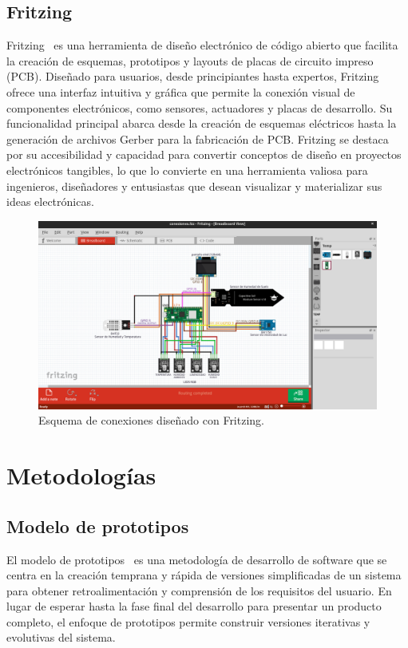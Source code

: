 \subsection{Fritzing}
Fritzing~\cite{misc:Fritzing} es una herramienta de diseño electrónico de código abierto que facilita la creación de esquemas, prototipos y layouts de placas de circuito impreso (PCB). Diseñado para usuarios, desde principiantes hasta expertos, Fritzing ofrece una interfaz intuitiva y gráfica que permite la conexión visual de componentes electrónicos, como sensores, actuadores y placas de desarrollo. Su funcionalidad principal abarca desde la creación de esquemas eléctricos hasta la generación de archivos Gerber para la fabricación de PCB. Fritzing se destaca por su accesibilidad y capacidad para convertir conceptos de diseño en proyectos electrónicos tangibles, lo que lo convierte en una herramienta valiosa para ingenieros, diseñadores y entusiastas que desean visualizar y materializar sus ideas electrónicas.
\begin{figure}[h]
    \centering
    \includegraphics[width=1\textwidth]{img/herramientas/fritzing.png}
    \caption{Esquema de conexiones diseñado con Fritzing.}
\end{figure}
\pagebreak

\section{Metodologías}
\subsection{Modelo de prototipos}
El modelo de prototipos~\cite{misc:Metodologia_ModeloDePrototipos} es una metodología de desarrollo de software que se centra en la creación temprana y rápida de versiones simplificadas de un sistema para obtener retroalimentación y comprensión de los requisitos del usuario. En lugar de esperar hasta la fase final del desarrollo para presentar un producto completo, el enfoque de prototipos permite construir versiones iterativas y evolutivas del sistema.

